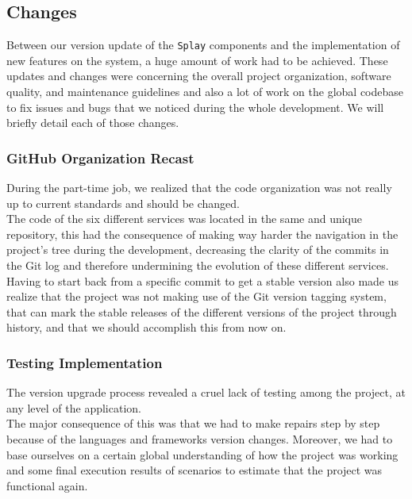 \documentclass{eplmastersthesis}
\begin{document}
      \subsection{Changes}

        Between our version update of the \texttt{Splay} components and the
        implementation of new features on the system, a huge amount of
        work had to be achieved. These updates and changes were concerning
        the overall project organization, software quality, and maintenance
        guidelines and also a lot of work on the global codebase to fix
        issues and bugs that we noticed during the whole development.
        We will briefly detail each of those changes.

        \subsubsection{GitHub Organization Recast}

          During the part-time job, we realized that the code organization
          was not really up to current standards and should be changed.\\
          The code of the six different services was located in the same and
          unique repository, this had the consequence of making way harder
          the navigation in the project's tree during the development, decreasing the
          clarity of the commits in the Git log and therefore undermining the evolution
          of these different services.\\

          Having to start back from a specific commit to get a stable version also made us realize that the
          project was not making use of the Git version tagging system, that
          can mark the stable releases of the different versions of the project
          through history, and that we should accomplish this from now on.

        \subsubsection{Testing Implementation}

          The version upgrade process revealed a cruel lack of testing among
          the project, at any level of the application.\\
          The major consequence of this was that we had to make repairs
          step by step because of the languages and frameworks version changes.
          Moreover, we had to base ourselves on a certain global understanding
          of how the project was working and some final execution results of
          scenarios to estimate that the project was functional again.\\
\end{document}
